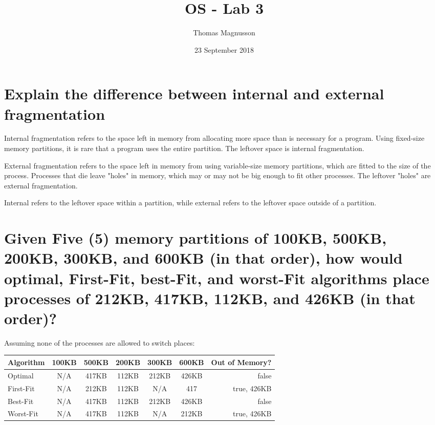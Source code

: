 \documentclass{article}
\title{OS - Lab 3}
\author{Thomas Magnusson}
\date{23 September 2018}
\begin{document}
\maketitle

\section{Explain the difference between internal and external fragmentation}

Internal fragmentation refers to the space left in memory from allocating more space than is necessary for a program. Using fixed-size memory partitions, it is rare that a program uses the entire partition. The leftover space is internal fragmentation.

External fragmentation refers to the space left in memory from using variable-size memory partitions, which are fitted to the size of the process. Processes that die leave "holes" in memory, which may or may not be big enough to fit other processes. The leftover "holes" are external fragmentation.

Internal refers to the leftover space within a partition, while external refers to the leftover space outside of a partition.

\section{Given	Five	(5)	memory	partitions	of	100KB,	500KB,	200KB,	300KB,	and	600KB	(in	that	
order),	how	would	optimal,	First-Fit,	best-Fit,	and	worst-Fit	algorithms	place	processes	
of	212KB,	417KB,	112KB,	and	426KB	(in	that	order)?}

Assuming none of the processes are allowed to switch places:

\begin{center}
  \begin{tabular}{ l | c | c | c | c | c | r }
    \hline
    \textbf{Algorithm} & \textbf{100KB} & \textbf{500KB} & \textbf{200KB} & \textbf{300KB} & \textbf{600KB} & \textbf{Out of Memory?}\\ \hline
    Optimal & N/A & 417KB & 112KB & 212KB & 426KB & false \\ \hline
    First-Fit & N/A & 212KB & 112KB & N/A & 417 & true, 426KB \\ \hline
    Best-Fit & N/A & 417KB & 112KB & 212KB & 426KB & false \\ \hline
    Worst-Fit & N/A & 417KB & 112KB & N/A & 212KB & true, 426KB \\ \hline
  \end{tabular}
\end{center}
\end{document}

